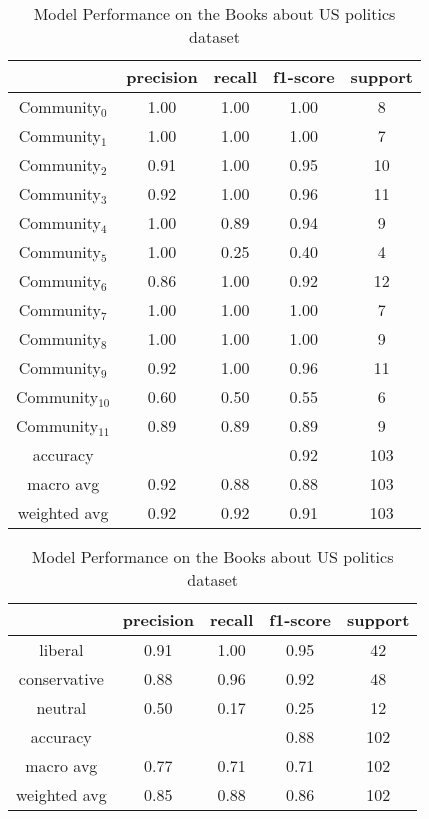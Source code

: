 \begin{table}[H]
\setlength{\tabcolsep}{5pt}
\parbox{.5\linewidth}{
\centering
\begin{tabular}{|c|c|c|c|c|}
\hline
 & precision & recall & f1-score & support \\
\hline\hline
Community$_0$ & 1.00 & 1.00 & 1.00 & 8  \\
Community$_1$ & 1.00 & 1.00 & 1.00 & 7 \\
Community$_2$ & 0.91 & 1.00 & 0.95 & 10 \\
Community$_3$ & 0.92 & 1.00 & 0.96 & 11 \\
Community$_4$ & 1.00 & 0.89 & 0.94 & 9 \\
Community$_5$ & 1.00 & 0.25 & 0.40 & 4 \\
Community$_6$ & 0.86 & 1.00 & 0.92 & 12 \\
Community$_7$ & 1.00 & 1.00 & 1.00 & 7 \\
Community$_8$ & 1.00 & 1.00 & 1.00 & 9 \\
Community$_9$ & 0.92 & 1.00 & 0.96 & 11 \\
Community$_{10}$ & 0.60 & 0.50 & 0.55 & 6 \\
Community$_{11}$ & 0.89 & 0.89 & 0.89 & 9 \\
\hline\hline
accuracy & & & 0.92 & 103 \\
macro avg & 0.92 & 0.88 & 0.88 & 103 \\
weighted avg & 0.92 & 0.92 & 0.91 & 103 \\
\hline
\end{tabular}
\caption{Model Performance on the American College football dataset}
\label{tab:football_PRF}
}
\hfill
\parbox{.5\linewidth}{
\parbox{\linewidth}{
\centering
\begin{tabular}{|c|c|c|c|c|}
\hline
 & precision & recall & f1-score & support \\
\hline\hline
liberal & 0.91 & 1.00 & 0.95 & 42  \\
conservative & 0.88 & 0.96 & 0.92 & 48 \\
neutral & 0.50 & 0.17 & 0.25 & 12 \\
\hline\hline
accuracy & & & 0.88 & 102 \\
macro avg & 0.77 & 0.71 & 0.71 & 102 \\
weighted avg & 0.85 & 0.88 & 0.86 & 102 \\
\hline
\end{tabular}
\caption{Model Performance on the Books about US politics dataset\\}
\label{tab:polbooks_PRF}
}}
\end{table}
